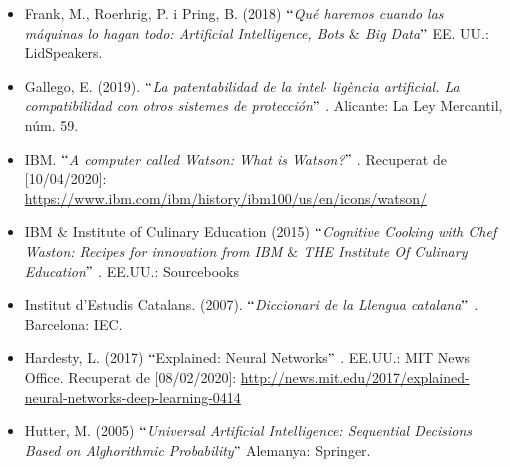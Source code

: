 \documentclass[12pt]{article}
\begin{document}
\begin{itemize}
\vspace{\baselineskip}
	\item Frank, M., Roerhrig, P. i Pring, B. (2018) $``$\textit{Qué haremos cuando las máquinas lo hagan todo: Artificial Intelligence, Bots $\&$  Big Data$"$ } EE. UU.: LidSpeakers.\par


\vspace{\baselineskip}
	\item Gallego, E. (2019). $``$\textit{La patentabilidad de la intel$ \cdot $ ligència artificial. La compatibilidad con otros sistemes de protección$"$ }. Alicante: La Ley Mercantil, núm. 59. \par


\vspace{\baselineskip}
	\item IBM. $``$\textit{A computer called Watson: What is Watson?}$"$ . Recuperat de [10/04/2020]: \href{https://www.ibm.com/ibm/history/ibm100/us/en/icons/watson/}{https://www.ibm.com/ibm/history/ibm100/us/en/icons/watson/} \par


\vspace{\baselineskip}
	\item IBM $\&$  Institute of Culinary Education (2015) \textit{$``$Cognitive Cooking with Chef Waston: Recipes for innovation from IBM $\&$  THE Institute Of Culinary Education$"$ }. EE.UU.: Sourcebooks\par


\vspace{\baselineskip}
	\item Institut d’Estudis Catalans. (2007). $``$\textit{Diccionari de la Llengua catalana$"$ . }Barcelona: IEC.\par


\vspace{\baselineskip}
	\item Hardesty, L. (2017) $``$Explained: Neural Networks$"$ . EE.UU.: MIT News Office. Recuperat de [08/02/2020]: \href{http://news.mit.edu/2017/explained-neural-networks-deep-learning-0414}{http://news.mit.edu/2017/explained-neural-networks-deep-learning-0414}\par


\vspace{\baselineskip}
	\item Hutter, M. (2005) $``$\textit{Universal Artificial Intelligence: Sequential Decisions Based on Alghorithmic Probability$"$  }Alemanya: Springer.\par



\end{itemize}
\end{document}

